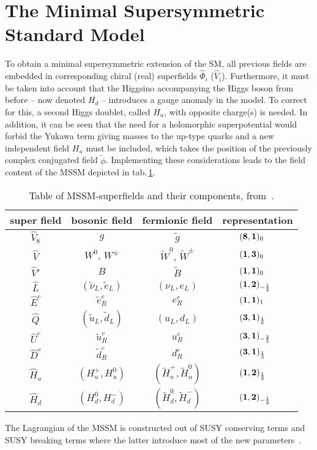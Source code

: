 \section{The Minimal Supersymmetric Standard Model}\label{mssm-basics}
To obtain a minimal supersymmetric extension of the SM, all previous fields are embedded in corresponding chiral (real) superfields $\hat{\Phi}_i$ ($\hat{V}_i$).
Furthermore, it must be taken into account that the Higgsino accompanying the Higgs boson from before – now denoted $H_d$ – introduces a gauge anomaly in the model. To correct for this, a second Higgs doublet, called $H_u$, with opposite charge(s) is needed. In addition, it can be seen that the need for a holomorphic superpotential would forbid the Yukawa term giving masses to the up-type quarks and a new independent field $H_u$ must be included, which takes the position of the previously complex conjugated field $\tilde{\phi}$.
Implementing these considerations leads to the field content of the MSSM depicted in tab.\,\ref{mssm-fields}.
\begin{table}[H]\centering
\caption{Table of MSSM-superfields and their components, from~\cite{pdg}.\label{mssm-fields}}
\bgroup
\def\arraystretch{1.4}
\begin{tabular}{cccl}
  super field& bosonic field& fermionic field& representation\\\hline
  $\hat{V}_8$& $g$& $\tilde{g}$& $\quad\quad(\mathbf{8}, \mathbf{1})_{0}$\\
  $\hat{V}$& $W^0$, $W^\pm$& $\tilde{W}^0$, $\tilde{W}^\pm$& $\quad\quad(\mathbf{1}, \mathbf{3})_{0}$\\
  $\hat{V}'$& $B$& $\tilde{B}$& $\quad\quad(\mathbf{1}, \mathbf{1})_{0}$\\
  $\hat{L}$& $(\tilde{\nu}_L, \tilde{e}_L)$& $(\nu_L, e_L)$& $\quad\quad(\mathbf{1}, \mathbf{2})_{-\frac12}$\\
  $\hat{E}^c$& $\tilde{e}_R^c$& $e_R^c$& $\quad\quad(\mathbf{1}, \mathbf{1})_{1}$\\
  $\hat{Q}$& $(\tilde{u}_L, \tilde{d}_L)$& $(u_L, d_L)$& $\quad\quad(\mathbf{3}, \mathbf{1})_{\frac16}$\\
  $\hat{U}^c$& $\tilde{u}_R^c$& $u_R^c$& $\quad\quad(\mathbf{3}, \mathbf{1})_{-\frac23}$\\
  $\hat{D}^c$& $\tilde{d}_R^c$& $d_R^c$& $\quad\quad(\mathbf{3}, \mathbf{1})_{\frac13}$\\
  $\hat{H}_u$& $\left(H_u^+, H_u^0\right)$& $\left(\tilde{H}_u^+, \tilde{H}_u^0\right)$& $\quad\quad(\mathbf{1}, \mathbf{2})_{\frac12}$\\
  $\hat{H}_d$& $(H_d^0, H_d^-)$& $(\tilde{H}^0_d, \tilde{H}_d^-)$& $\quad\quad(\mathbf{1}, \mathbf{2})_{-\frac12}$
\end{tabular}
\egroup
\end{table}
\noindent The Lagrangian of the MSSM is constructed out of SUSY conserving terms and SUSY breaking terms where the latter introduce most of the new parameters~\cite{abc, primer, pdg, arthur, haber}.

